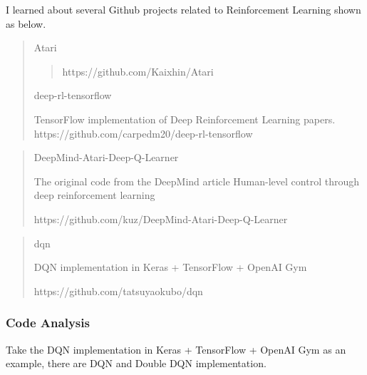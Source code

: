 \documentclass[10pt,twocolumn,letterpaper]{article}
\begin{document}
	I learned about several Github projects related to Reinforcement Learning shown as below. 
	
	
	\begin{quote}
		\begin{center}
			Atari\\
			\begin{quote}
				https://github.com/Kaixhin/Atari
			\end{quote}
			deep-rl-tensorflow
			
		\end{center}
		
		TensorFlow implementation of Deep Reinforcement Learning papers.\\
		https://github.com/carpedm20/deep-rl-tensorflow
		
	\end{quote}
	
	
	\begin{quote}
		\begin{center}
			DeepMind-Atari-Deep-Q-Learner
		\end{center}
		The original code from the DeepMind article Human-level control through deep reinforcement learning
		
		https://github.com/kuz/DeepMind-Atari-Deep-Q-Learner
	\end{quote}
	
	\begin{quote}
		\begin{center}
			dqn
		\end{center}
		DQN implementation in Keras + TensorFlow + OpenAI Gym 
		
		https://github.com/tatsuyaokubo/dqn
	\end{quote}
	\subsubsection{Code Analysis}
	Take the DQN implementation in Keras + TensorFlow + OpenAI Gym as an example, there are DQN and Double DQN implementation.
\end{document}
